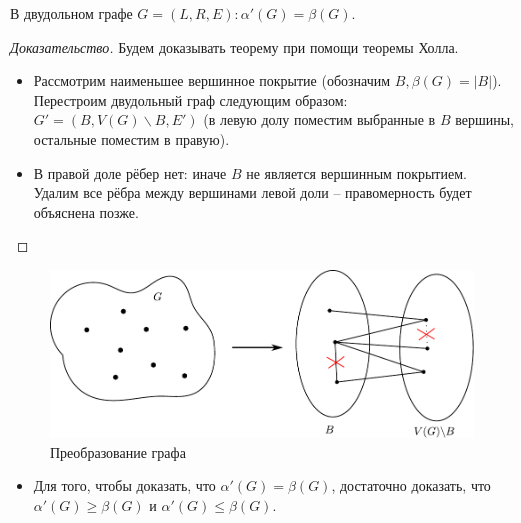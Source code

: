 \begin{frame}[t]
    \begin{theorem}[D.König, 1931]
        В двудольном графе $G = \left( L, R, E \right): \alpha'(G) = \beta(G)$.
    \end{theorem}

    \begin{proof}[Доказательство]
        \renewcommand{\qedsymbol}{}
        Будем доказывать теорему при помощи теоремы Холла.
        \begin{itemize}
            \item Рассмотрим наименьшее вершинное покрытие (обозначим $B, \beta(G) = |B|$). Перестроим двудольный граф следующим образом: $G' = \left(B, V(G) \backslash B, E'\right)$ (в левую долу поместим выбранные в $B$ вершины, остальные поместим в правую).
            \item В правой доле рёбер нет: иначе $B$ не является вершинным покрытием. Удалим все рёбра между вершинами левой доли -- правомерность будет объяснена позже.
        \end{itemize}
          
    \end{proof}
\end{frame}

\begin{frame}[t]
    \begin{figure}[htpb]
        \centering
        \includegraphics[width=\textwidth]{images/transform}
        \footnotesize Преобразование графа
        \label{fig:transform}
    \end{figure}
    
    \begin{itemize}
        \item Для того, чтобы доказать, что $\alpha'(G) = \beta(G)$, достаточно доказать, что $\alpha'(G) \geq \beta(G)$ и $\alpha'(G) \leq \beta(G)$.
    \end{itemize}
    
\end{frame}

